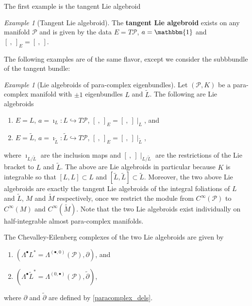 \documentclass[letterpaper,12pt]{article}
\newcommand{\id}{\mathbbm{1}}
\newcommand{\PS}{\mathcal{P}}
\newcommand{\p}{\partial}
\newcommand{\pt}{\tilde{\partial}}
\newcommand{\Lt}{{\tl{L}}}
\newcommand{\brac}{[\ ,\ ]}
\newcommand{\Mt}{\tl{M}}
\def\tl{\tilde}
\theoremstyle{definition}
\theoremstyle{remark}
\theoremstyle{examples}
\newtheorem{Ex}[theorem]{Example}
\begin{document}
The first example is the tangent Lie algebroid
\begin{Ex}[Tangent Lie algebroid]\label{ex:tangent_lie}
The {\bf tangent Lie algebroid} exists on any manifold $\PS$ and is given by the data $E=T\PS$, $a=\id$ and $\brac_E=\brac$.
\end{Ex}

The following examples are of the same flavor, except we consider the subbbundle of the tangent bundle:
\begin{Ex}[Lie algebroids of para-complex eigenbundles]\label{ex:real-lie-algds-on-paracpx}
Let $(\PS,K)$ be a para-complex manifold with $\pm 1$ eigenbundles $L$ and $\Lt$. The following are Lie algebroids
\begin{enumerate}
\item $E=L$, $a=\imath_L:L\hookrightarrow T\PS$, $\brac_E=\brac\mid_L$, and
\item $E=\Lt$, $a=\imath_\Lt:\Lt\hookrightarrow T\PS$, $\brac_E=\brac\mid_\Lt$,
\end{enumerate}
where $\imath_{L/\Lt}$ are the inclusion maps and $\brac\mid_{L/\Lt}$ are the restrictions of the Lie bracket to $L$ and $\Lt$. The above are Lie algebroids in particular because $K$ is integrable so that $[L,L]\subset L$ and $[\Lt,\Lt]\subset \Lt$. Moreover, the two above Lie algebroids are exactly the tangent Lie algebroids of the integral foliations of $L$ and $\Lt$, $M$ and $\Mt$ respectively, once we restrict the module from $C^\infty(\PS)$ to $C^\infty(M)$ and $C^\infty(\Mt)$. Note that the two Lie algebroids exist individually on half-integrable almost para-complex manifolds.

The Chevalley-Eilenberg complexes of the two Lie algebroids are given by
\begin{enumerate}
\item $(\Lambda^\bullet L^*=\Lambda^{(\bullet,0)}(\PS),\p)$, and
\item $(\Lambda^\bullet \Lt^*=\Lambda^{(0,\bullet)}(\PS),\pt)$,
\end{enumerate}
where $\p$ and $\pt$ are defined by \eqref{paracomplex_dels}.
\end{Ex}
\end{document}
